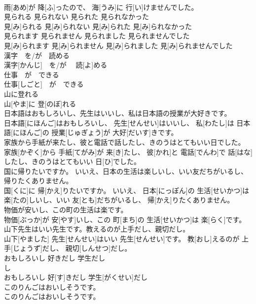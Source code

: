 \documentclass[8pt]{extreport}
\begin{document}
\begin{CJK}{UTF8}{min}
\\	雨[あめ]が 降[ふ]ったので、 海[うみ]に 行[い]けませんでした。	
\\	見られる 見られない 見られた 見られなかった	
\\	見[み]られる 見[み]られない 見[み]られた 見[み]られなかった	
\\	見られます 見られません 見られました 見られませんでした	
\\	見[み]られます 見[み]られません 見[み]られました 見[み]られませんでした	
\\	漢字　を/が　読める	
\\	漢字[かんじ]　を/が　 読[よ]める	
\\	仕事　が　できる	
\\	仕事[しごと]　が　できる	
\\	山に登れる	
\\	山[やま]に 登[のぼ]れる	
\\	日本語はおもしろいし、先生はいいし、私は日本語の授業が大好きです。	
\\	日本語[にほんご]はおもしろいし、 先生[せんせい]はいいし、 私[わたし]は 日本語[にほんご]の 授業[じゅぎょう]が 大好[だいす]きです。	
\\	家族から手紙が来たし、彼と電話で話したし、きのうはとてもいい日でした。	
\\	家族[かぞく]から 手紙[てがみ]が 来[き]たし、 彼[かれ]と 電話[でんわ]で 話[はな]したし、きのうはとてもいい 日[ひ]でした。	
\\	国に帰りたいですか。 いいえ、日本の生活は楽しいし、いい友だちがいるし、帰りたくありません。	
\\	国[くに]に 帰[かえ]りたいですか。 いいえ、 日本[にっぽん]の 生活[せいかつ]は 楽[たの]しいし、いい 友[とも]だちがいるし、 帰[かえ]りたくありません。	
\\	物価が安いし、この町の生活は楽です。	
\\	物価[ぶっか]が 安[やす]いし、この 町[まち]の 生活[せいかつ]は 楽[らく]です。	
\\	山下先生はいい先生です。教えるのが上手だし、親切だし。	
\\	山下[やました] 先生[せんせい]はいい 先生[せんせい]です。 教[おし]えるのが 上手[じょうず]だし、 親切[しんせつ]だし。	
\\	おもしろいし 好きだし 学生だし	
\\	し 
\\	おもしろいし 好[す]きだし 学生[がくせい]だし	
\\	このりんごはおいしそうです。	
\\	このりんごはおいしそうです。	

\end{CJK}
\end{document}
